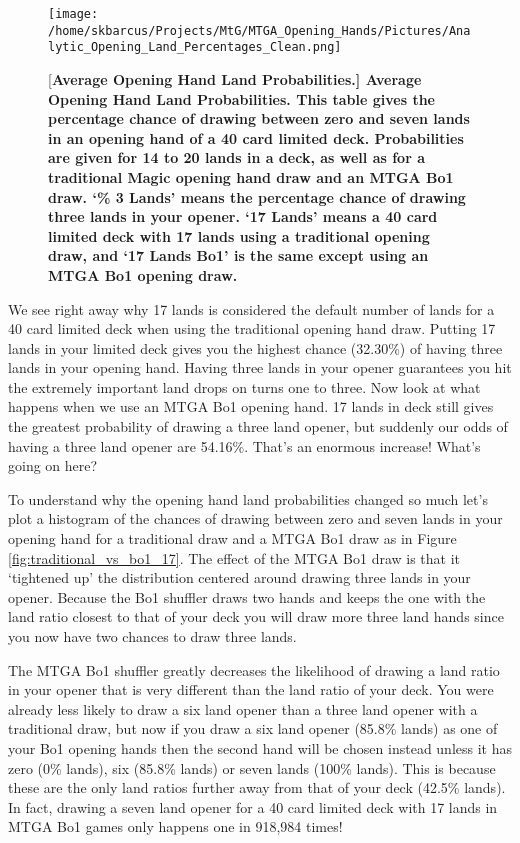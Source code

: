 \documentclass[oneside]{book}   %
\begin{document}
	\begin{figure}[!ht]
	\centering
	\centerline{\texttt{[image: /home/skbarcus/Projects/MtG/MTGA\_Opening\_Hands/Pictures/Analytic\_Opening\_Land\_Percentages\_Clean.png]}}
	[\bf{Average Opening Hand Land Probabilities.}]{
	{\bf{Average Opening Hand Land Probabilities.}} This table gives the percentage chance of drawing between zero and seven lands in an opening hand of a 40 card limited deck. Probabilities are given for 14 to 20 lands in a deck, as well as for a traditional Magic opening hand draw and an MTGA Bo1 draw. `\% 3 Lands' means the percentage chance of drawing three lands in your opener. `17 Lands' means a 40 card limited deck with 17 lands using a traditional opening draw, and `17 Lands Bo1' is the same except using an MTGA Bo1 opening draw.}
	\label{fig:opening_hand_probabilities}
	\end{figure}	
	
We see right away why 17 lands is considered the default number of lands for a 40 card limited deck when using the traditional opening hand draw. Putting 17 lands in your limited deck gives you the highest chance (32.30\%) of having three lands in your opening hand. Having three lands in your opener guarantees you hit the extremely important land drops on turns one to three. Now look at what happens when we use an MTGA Bo1 opening hand. 17 lands in deck still gives the greatest probability of drawing a three land opener, but suddenly our odds of having a three land opener are 54.16\%. That's an enormous increase! What's going on here?

To understand why the opening hand land probabilities changed so much let's plot a histogram of the chances of drawing between zero and seven lands in your opening hand for a traditional draw and a MTGA Bo1 draw as in Figure \ref{fig:traditional_vs_bo1_17}. The effect of the MTGA Bo1 draw is that it `tightened up' the distribution centered around drawing three lands in your opener. Because the Bo1 shuffler draws two hands and keeps the one with the land ratio closest to that of your deck you will draw more three land hands since you now have two chances to draw three lands. 

The MTGA Bo1 shuffler greatly decreases the likelihood of drawing a land ratio in your opener that is very different than the land ratio of your deck. You were already less likely to draw a six land opener than a three land opener with a traditional draw, but now if you draw a six land opener (85.8\% lands) as one of your Bo1 opening hands then the second hand will be chosen instead unless it has zero (0\% lands), six (85.8\% lands) or seven lands (100\% lands). This is because these are the only land ratios further away from that of your deck (42.5\% lands). In fact, drawing a seven land opener for a 40 card limited deck with 17 lands in MTGA Bo1 games only happens one in 918,984 times!
\end{document}
